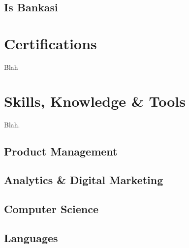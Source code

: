 \documentclass[11pt,twoside,a4paper]{article}
\begin{document}
    \subsection{Is Bankasi}

  \section{Certifications}
  Blah

  \section{Skills, Knowledge \& Tools}
  Blah.
    \subsection{Product Management}
    \subsection{Analytics \& Digital Marketing}
    \subsection{Computer Science}
    \subsection{Languages}
\end{document}
